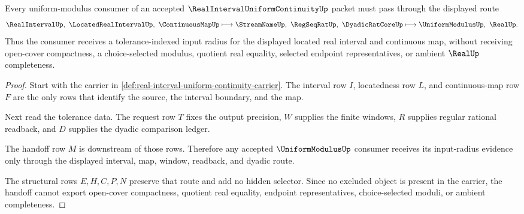 \begin{theorem}
\label{thm:real-interval-uniform-continuity-modulus-handoff}
Every uniform-modulus consumer of an accepted $\RealIntervalUniformContinuityUp$ packet must pass through the displayed route
$$
\RealIntervalUp,\ \LocatedRealIntervalUp,\ \ContinuousMapUp
\longmapsto
\StreamNameUp,\ \RegSeqRatUp,\ \DyadicRatCoreUp
\longmapsto
\UniformModulusUp,\ \RealUp .
$$
Thus the consumer receives a tolerance-indexed input radius for the displayed located real interval and continuous map, without receiving open-cover compactness, a choice-selected modulus, quotient real equality, selected endpoint representatives, or ambient $\RealUp$ completeness.
\end{theorem}
\begin{proof}
Start with the carrier in \autoref{def:real-interval-uniform-continuity-carrier}. The interval row $I$, locatedness row $L$, and continuous-map row $F$ are the only rows that identify the source, the interval boundary, and the map.

Next read the tolerance data. The request row $T$ fixes the output precision, $W$ supplies the finite windows, $R$ supplies regular rational readback, and $D$ supplies the dyadic comparison ledger.

The handoff row $M$ is downstream of those rows. Therefore any accepted $\UniformModulusUp$ consumer receives its input-radius evidence only through the displayed interval, map, window, readback, and dyadic route.

The structural rows $E,H,C,P,N$ preserve that route and add no hidden selector. Since no excluded object is present in the carrier, the handoff cannot export open-cover compactness, quotient real equality, endpoint representatives, choice-selected moduli, or ambient completeness.
\end{proof}


